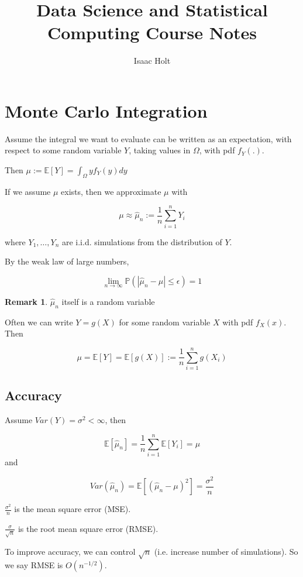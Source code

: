 \documentclass[12pt,a4paper]{article}
\title{Data Science and Statistical Computing Course Notes}
\author{Isaac Holt}
\theoremstyle{definition}
\newtheorem*{remark}{Remark}
\begin{document}
\maketitle

\section{Monte Carlo Integration}

Assume the integral we want to evaluate can be written as an expectation, with respect to some random variable $Y$, taking values in $\Omega$, with pdf $f_Y(.)$.

Then $\mu := \mathbb{E}[Y] = \int_{\Omega} y f_Y(y)dy$

If we assume $\mu$ exists, then we approximate $\mu$ with 

\[\mu \approx \hat{\mu}_n := \frac{1}{n} \sum_{i = 1}^{n} Y_i\]

where $Y_1, \dots, Y_n$ are i.i.d. simulations from the distribution of $Y$.

By the weak law of large numbers,

\[\lim_{n \rightarrow \infty} \mathbb{P}(|\hat{\mu}_n - \mu| \le \epsilon) = 1\]

\begin{remark}
	$\hat{\mu}_n$ itself is a random variable
\end{remark}

Often we can write $Y = g(X)$ for some random variable $X$ with pdf $f_X(x)$. Then

\[\mu = \mathbb{E}[Y] = \mathbb{E}[g(X)] := \frac{1}{n} \sum_{i = 1}^{n} g(X_i)\]

\subsection{Accuracy}

Assume $Var(Y) = \sigma^2 < \infty$, then

\[\mathbb{E}[\hat{\mu}_n] = \frac{1}{n} \sum_{i = 1}^{n} \mathbb{E}[Y_i] = \mu\] and 

\[Var(\hat{\mu}_n) = \mathbb{E}[{(\hat{\mu}_n - \mu)} ^ 2] = \frac{\sigma^2}{n}\]

$\frac{\sigma^2}{n}$ is the mean square error (MSE).

$\frac{\sigma}{\sqrt{n}}$ is the root mean square error (RMSE).

To improve accuracy, we can control $\sqrt{n}$ (i.e. increase number of simulations). So we say RMSE is $O(n^{-1 / 2})$.
\end{document}
